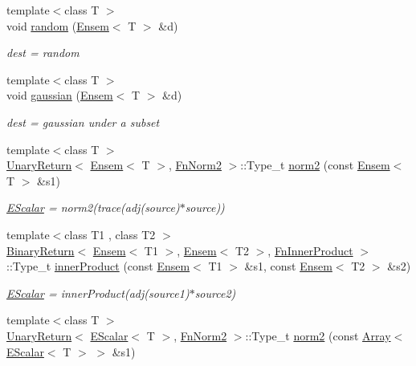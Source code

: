 \begin{DoxyCompactItemize}
{\footnotesize template$<$class T $>$ }\\void \mbox{\hyperlink{namespaceENSEM_a7e217f3d73216cb71b6221611387c805}{random}} (\mbox{\hyperlink{classENSEM_1_1Ensem}{Ensem}}$<$ T $>$ \&d)
\begin{DoxyCompactList}\small\item\em dest = random \end{DoxyCompactList}\item 
{\footnotesize template$<$class T $>$ }\\void \mbox{\hyperlink{namespaceENSEM_adc1e01b99bd6ff80c11a18cf059f00de}{gaussian}} (\mbox{\hyperlink{classENSEM_1_1Ensem}{Ensem}}$<$ T $>$ \&d)
\begin{DoxyCompactList}\small\item\em dest = gaussian under a subset \end{DoxyCompactList}\item 
{\footnotesize template$<$class T $>$ }\\\mbox{\hyperlink{structENSEM_1_1UnaryReturn}{Unary\+Return}}$<$ \mbox{\hyperlink{classENSEM_1_1Ensem}{Ensem}}$<$ T $>$, \mbox{\hyperlink{structENSEM_1_1FnNorm2}{Fn\+Norm2}} $>$\+::Type\+\_\+t \mbox{\hyperlink{namespaceENSEM_a846e917e7120ca978ffdb7146357bf07}{norm2}} (const \mbox{\hyperlink{classENSEM_1_1Ensem}{Ensem}}$<$ T $>$ \&s1)
\begin{DoxyCompactList}\small\item\em \mbox{\hyperlink{classENSEM_1_1EScalar}{E\+Scalar}} = norm2(trace(adj(source)$\ast$source)) \end{DoxyCompactList}\item 
{\footnotesize template$<$class T1 , class T2 $>$ }\\\mbox{\hyperlink{structENSEM_1_1BinaryReturn}{Binary\+Return}}$<$ \mbox{\hyperlink{classENSEM_1_1Ensem}{Ensem}}$<$ T1 $>$, \mbox{\hyperlink{classENSEM_1_1Ensem}{Ensem}}$<$ T2 $>$, \mbox{\hyperlink{structENSEM_1_1FnInnerProduct}{Fn\+Inner\+Product}} $>$\+::Type\+\_\+t \mbox{\hyperlink{namespaceENSEM_a27e5add94db1e27059d44144e3a3fb99}{inner\+Product}} (const \mbox{\hyperlink{classENSEM_1_1Ensem}{Ensem}}$<$ T1 $>$ \&s1, const \mbox{\hyperlink{classENSEM_1_1Ensem}{Ensem}}$<$ T2 $>$ \&s2)
\begin{DoxyCompactList}\small\item\em \mbox{\hyperlink{classENSEM_1_1EScalar}{E\+Scalar}} = inner\+Product(adj(source1)$\ast$source2) \end{DoxyCompactList}\item 
{\footnotesize template$<$class T $>$ }\\\mbox{\hyperlink{structENSEM_1_1UnaryReturn}{Unary\+Return}}$<$ \mbox{\hyperlink{classENSEM_1_1EScalar}{E\+Scalar}}$<$ T $>$, \mbox{\hyperlink{structENSEM_1_1FnNorm2}{Fn\+Norm2}} $>$\+::Type\+\_\+t \mbox{\hyperlink{namespaceENSEM_afe2995777022f093a0938da761cb5ac3}{norm2}} (const \mbox{\hyperlink{classXMLArray_1_1Array}{Array}}$<$ \mbox{\hyperlink{classENSEM_1_1EScalar}{E\+Scalar}}$<$ T $>$ $>$ \&s1)

\end{DoxyCompactItemize}
